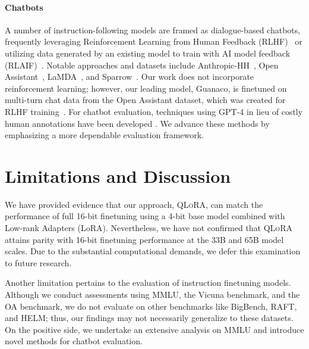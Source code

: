 \paragraph{Chatbots} A number of instruction-following models are framed as dialogue-based chatbots, frequently leveraging Reinforcement Learning from Human Feedback (RLHF)~\citep{christiano2017deep} or utilizing data generated by an existing model to train with AI model feedback (RLAIF)~\citep{bai2022constitutional}. Notable approaches and datasets include Anthropic-HH~\citep{askell2021general,bai2022training}, Open Assistant~\citep{kopf2023openassistant}, LaMDA~\citep{thoppilan2022lamda}, and Sparrow~\citep{glaese2022improving}. Our work does not incorporate reinforcement learning; however, our leading model, Guanaco, is finetuned on multi-turn chat data from the Open Assistant dataset, which was created for RLHF training~\citep{kopf2023openassistant}. For chatbot evaluation, techniques using GPT-4 in lieu of costly human annotations have been developed \citep{vicuna2023,peng2023instruction}. We advance these methods by emphasizing a more dependable evaluation framework.

\section{Limitations and Discussion}

We have provided evidence that our approach, \textsc{QLoRA}, can match the performance of full 16-bit finetuning using a 4-bit base model combined with Low-rank Adapters (LoRA). Nevertheless, we have not confirmed that \textsc{QLoRA} attains parity with 16-bit finetuning performance at the 33B and 65B model scales. Due to the substantial computational demands, we defer this examination to future research.

Another limitation pertains to the evaluation of instruction finetuning models. Although we conduct assessments using MMLU, the Vicuna benchmark, and the OA benchmark, we do not evaluate on other benchmarks like BigBench, RAFT, and HELM; thus, our findings may not necessarily generalize to these datasets. On the positive side, we undertake an extensive analysis on MMLU and introduce novel methods for chatbot evaluation.

